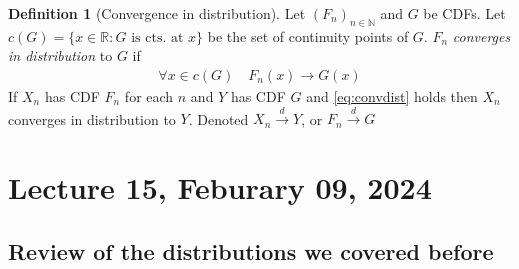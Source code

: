 \documentclass[
]{book}
\theoremstyle{definition}
\newtheorem{definition}{Definition}[chapter]
\theoremstyle{definition}
\theoremstyle{definition}
\theoremstyle{definition}
\theoremstyle{remark}
\begin{document}
\begin{definition}[Convergence in distribution]
Let \((F_n)_{n\in\mathbb{N}}\) and \(G\) be CDFs. Let \(c(G) = \{x\in\mathbb{R} : G \text{ is cts. at }x\}\) be the set of continuity points of \(G\). \(F_n\) \emph{converges in distribution} to \(G\) if
\begin{align}
    \forall x\in c(G) \quad F_n(x)\to G(x)  \label{eq:convdist}
\end{align}
If \(X_n\) has CDF \(F_n\) for each \(n\) and \(Y\) has CDF \(G\) and \eqref{eq:convdist} holds then \(X_n\) converges in distribution to \(Y\). Denoted \(X_n \stackrel{d}{\to} Y\), or \(F_n \stackrel{d}{\to} G\)
\end{definition}

\chapter{Lecture 15, Feburary 09, 2024}\label{lecture-15-feburary-09-2024}

\section{Review of the distributions we covered before}\label{review-of-the-distributions-we-covered-before}
\end{document}
